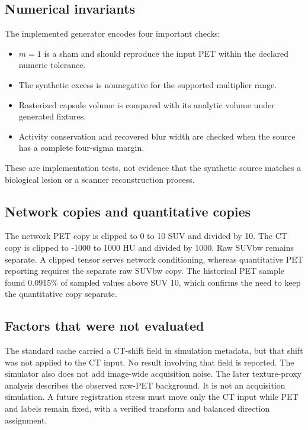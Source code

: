 \documentclass[11pt]{article}
\begin{document}
\subsection{Numerical invariants}

The implemented generator encodes four important checks:

\begin{itemize}
  \item $m=1$ is a sham and should reproduce the input PET within the declared numeric tolerance.
  \item The synthetic excess is nonnegative for the supported multiplier range.
  \item Rasterized capsule volume is compared with its analytic volume under generated fixtures.
  \item Activity conservation and recovered blur width are checked when the source has a complete four-sigma margin.
\end{itemize}

These are implementation tests, not evidence that the synthetic source matches a biological lesion or a scanner reconstruction process.

\subsection{Network copies and quantitative copies}

The network PET copy is clipped to 0 to 10 SUV and divided by 10. The CT copy is clipped to -1000 to 1000 HU and divided by 1000. Raw SUVbw remains separate. A clipped tensor serves network conditioning, whereas quantitative PET reporting requires the separate raw SUVbw copy. The historical PET sample found 0.0915\% of sampled values above SUV 10, which confirms the need to keep the quantitative copy separate.

\subsection{Factors that were not evaluated}

The standard cache carried a CT-shift field in simulation metadata, but that shift was not applied to the CT input. No result involving that field is reported. The simulator also does not add image-wide acquisition noise. The later texture-proxy analysis describes the observed raw-PET background. It is not an acquisition simulation. A future registration stress must move only the CT input while PET and labels remain fixed, with a verified transform and balanced direction assignment.
\end{document}
